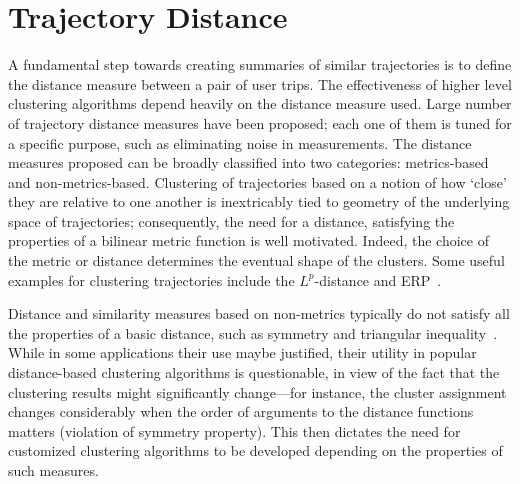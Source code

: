 \section{Trajectory Distance}
\label{sec:trajDist}
\begin{comment}
\begin{table*}
	\centering
		\begin{tabular}{|c|c|c|c|c|c|} 
			\hline
			Sim Measure&Is Metric&Type&Sen. to sample noise&OD Cognizant&Computational Cost\\
			\hline
			LP Norm&Yes&Sampling Sensitive&No&No&O(N)\\
			DTW/LCSS/EDW/EDW With real sequences&No&Sampling Sensitive&Yes&No&O($n^2$)\\
			EDWP&Yes&Sampling Sensitive&Yes&No&??\\
			LP Norm with Interpolation&Yes&Shape Sensitive&No&No&O(Num samples)\\
			ODSim (Ours)&Yes&Shape sensitive&No&No&O(Num samples)\\
			\hline
		\end{tabular}
	\caption{Taxonomy of Similarity Measures}
	\label{tab:simTaxonomy}
\end{table*}
\end{comment}

A fundamental step towards creating summaries of similar trajectories is to define the distance measure between a pair of user trips. The effectiveness of higher level clustering algorithms depend heavily on the distance measure used. Large number of trajectory distance measures have been proposed; each one of them is tuned for a specific purpose, such as eliminating noise in measurements. The distance measures proposed can be broadly classified into two categories: metrics-based and non-metrics-based. Clustering of trajectories based on a notion of how `close' they are relative to one another is inextricably tied to geometry of the underlying space of trajectories; consequently, the need for a distance, satisfying the properties of a bilinear metric function is well motivated. Indeed, the choice of the metric or distance determines the eventual shape of the clusters. Some useful examples for clustering trajectories include the $L^p$-distance and ERP~\cite{Chen2004}. 

Distance and similarity measures based on non-metrics typically do not satisfy all the properties of a basic distance, such as symmetry and triangular inequality~\cite{Chen2004}. While in some applications their use maybe justified, their utility in popular distance-based clustering algorithms is questionable, in view of the fact that the clustering results might significantly change---for instance, the cluster assignment changes considerably when the order of arguments to the distance functions matters (violation of symmetry property). This then dictates the need for customized clustering algorithms to be developed depending on the properties of such measures. 

